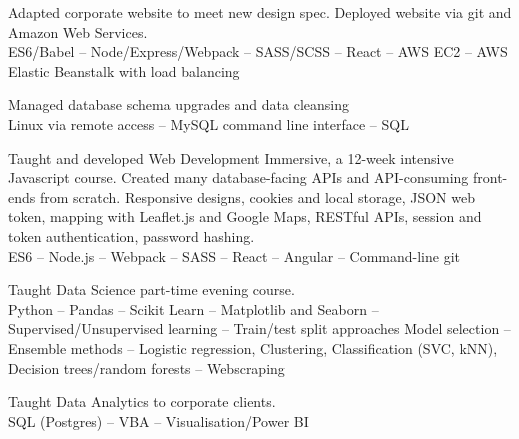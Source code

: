 \documentclass[a4paper,nomath]{deedy-resume} %
\begin{document}
\begin{paracol}{2}
\begin{tightitemize}
    \end{tightitemize}
    
    \sectionspace %
    
    
    \vspace{\topsep} %
    \begin{tightitemize}
        \item Adapted corporate website to meet new design spec. Deployed website via git and Amazon Web Services.
        \\
        ES6/Babel -- Node/Express/Webpack -- SASS/SCSS -- React -- AWS EC2 -- AWS Elastic Beanstalk with load balancing
        \\
        \item Managed database schema upgrades and data cleansing\\
        Linux via remote access -- MySQL command line interface -- SQL
        
    \end{tightitemize}
    
    \sectionspace %
    

    \vspace{\topsep} %
    \begin{tightitemize}
        \item Taught and developed Web Development Immersive, a 12-week intensive Javascript course.
        Created many database-facing APIs and API-consuming front-ends from scratch.
        Responsive designs, cookies and local storage, JSON web token, mapping with Leaflet.js and Google Maps,
        RESTful APIs, session and token authentication, password hashing.
        \\
        ES6 -- Node.js -- Webpack -- SASS -- React -- Angular -- Command-line git
        \\
        \item Taught Data Science part-time evening course.\\
        Python -- Pandas -- Scikit Learn -- Matplotlib and Seaborn -- Supervised/Unsupervised learning -- Train/test split approaches \textbullet {} Model selection -- Ensemble methods -- Logistic regression, Clustering, Classification (SVC, kNN), Decision trees/random forests -- Webscraping \\
        \item Taught Data Analytics to corporate clients.\\
        SQL (Postgres) -- VBA -- Visualisation/Power BI
        

\end{tightitemize}
\end{paracol}
\end{document}
